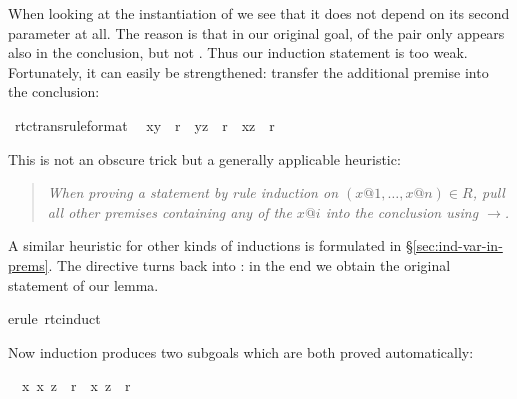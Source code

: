 \begin{isabellebody}
\begin{isamarkuptxt}
When looking at the instantiation of  we see that it does not
depend on its second parameter at all. The reason is that in our original
goal, of the pair  only  appears also in the
conclusion, but not . Thus our induction statement is too
weak. Fortunately, it can easily be strengthened:
transfer the additional premise  into the conclusion:%
\end{isamarkuptxt}%
%
\endisatagproof
{\isafoldproof}%
%
\isadelimproof
%
\endisadelimproof
\isamarkupfalse%
\ rtc{\isacharunderscore}trans{\isacharbrackleft}rule{\isacharunderscore}format{\isacharbrackright}{\isacharcolon}\isanewline
\ \ {\isachardoublequote}{\isacharparenleft}x{\isacharcomma}y{\isacharparenright}\ {\isasymin}\ r{\isacharasterisk}\ {\isasymLongrightarrow}\ {\isacharparenleft}y{\isacharcomma}z{\isacharparenright}\ {\isasymin}\ r{\isacharasterisk}\ {\isasymlongrightarrow}\ {\isacharparenleft}x{\isacharcomma}z{\isacharparenright}\ {\isasymin}\ r{\isacharasterisk}{\isachardoublequote}%
\isadelimproof
%
\endisadelimproof
%
\isatagproof
\isamarkuptrue%
%
\begin{isamarkuptxt}%
\noindent
This is not an obscure trick but a generally applicable heuristic:
\begin{quote}\em
When proving a statement by rule induction on $(x@1,\dots,x@n) \in R$,
pull all other premises containing any of the $x@i$ into the conclusion
using $\longrightarrow$.
\end{quote}
A similar heuristic for other kinds of inductions is formulated in
\S\ref{sec:ind-var-in-prems}. The  directive turns
\isa{{\isasymlongrightarrow}} back into \isa{{\isasymLongrightarrow}}: in the end we obtain the original
statement of our lemma.%
\end{isamarkuptxt}%
\isamarkupfalse%
erule\ rtc{\isachardot}induct{\isacharparenright}\isamarkuptrue%
%
\begin{isamarkuptxt}%
\noindent
Now induction produces two subgoals which are both proved automatically:
\begin{isabelle}%
\ {}{\isachardot}\ {\isasymAnd}x{\isachardot}\ {\isacharparenleft}x{\isacharcomma}\ z{\isacharparenright}\ {\isasymin}\ r{\isacharasterisk}\ {\isasymlongrightarrow}\ {\isacharparenleft}x{\isacharcomma}\ z{\isacharparenright}\ {\isasymin}\ r{\isacharasterisk}\isanewline

\end{isabelle}
\end{isamarkuptxt}
\end{isabellebody}
